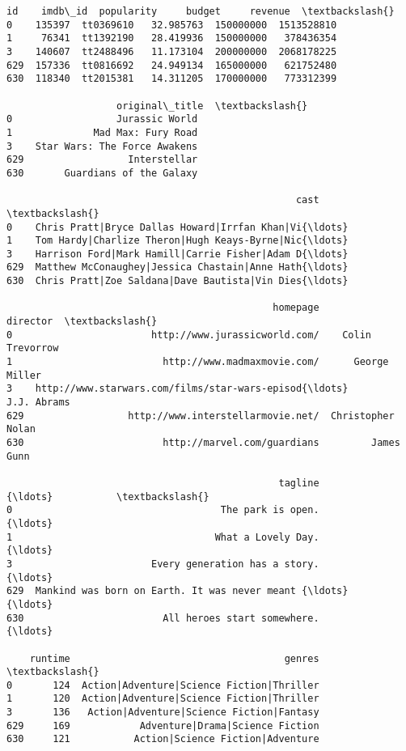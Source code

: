 \documentclass[11pt]{article}
\begin{document}
    \begin{Verbatim}[commandchars=\\\{\}]
         id    imdb\_id  popularity     budget     revenue  \textbackslash{}
0    135397  tt0369610   32.985763  150000000  1513528810   
1     76341  tt1392190   28.419936  150000000   378436354   
3    140607  tt2488496   11.173104  200000000  2068178225   
629  157336  tt0816692   24.949134  165000000   621752480   
630  118340  tt2015381   14.311205  170000000   773312399   

                   original\_title  \textbackslash{}
0                  Jurassic World   
1              Mad Max: Fury Road   
3    Star Wars: The Force Awakens   
629                  Interstellar   
630       Guardians of the Galaxy   

                                                  cast  \textbackslash{}
0    Chris Pratt|Bryce Dallas Howard|Irrfan Khan|Vi{\ldots}   
1    Tom Hardy|Charlize Theron|Hugh Keays-Byrne|Nic{\ldots}   
3    Harrison Ford|Mark Hamill|Carrie Fisher|Adam D{\ldots}   
629  Matthew McConaughey|Jessica Chastain|Anne Hath{\ldots}   
630  Chris Pratt|Zoe Saldana|Dave Bautista|Vin Dies{\ldots}   

                                              homepage           director  \textbackslash{}
0                        http://www.jurassicworld.com/    Colin Trevorrow   
1                          http://www.madmaxmovie.com/      George Miller   
3    http://www.starwars.com/films/star-wars-episod{\ldots}        J.J. Abrams   
629                  http://www.interstellarmovie.net/  Christopher Nolan   
630                        http://marvel.com/guardians         James Gunn   

                                               tagline          {\ldots}           \textbackslash{}
0                                    The park is open.          {\ldots}            
1                                   What a Lovely Day.          {\ldots}            
3                        Every generation has a story.          {\ldots}            
629  Mankind was born on Earth. It was never meant {\ldots}          {\ldots}            
630                        All heroes start somewhere.          {\ldots}            

    runtime                                     genres  \textbackslash{}
0       124  Action|Adventure|Science Fiction|Thriller   
1       120  Action|Adventure|Science Fiction|Thriller   
3       136   Action|Adventure|Science Fiction|Fantasy   
629     169            Adventure|Drama|Science Fiction   
630     121           Action|Science Fiction|Adventure   


\end{Verbatim}
\end{document}
